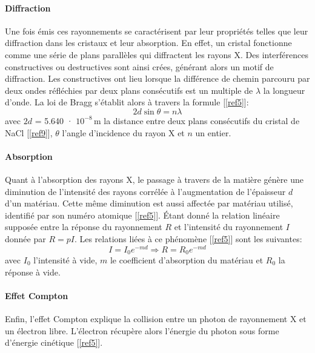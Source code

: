 \documentclass[a4paper, 12pt,oneside]{article}
\begin{document}
\paragraph{Diffraction}
Une fois émis ces rayonnements se caractérisent par leur propriétés telles que leur diffraction dans les cristaux et leur absorption. En effet, un cristal fonctionne comme une série de plans parallèles qui diffractent les rayons X. Des interférences constructives ou destructives sont ainsi crées, générant alors un motif de diffraction. Les constructives ont lieu lorsque la différence de chemin parcouru par deux ondes réfléchies par deux plans consécutifs est un multiple de $\lambda$ la longueur d'onde. La loi de Bragg s'établit alors à travers la formule [\ref{ref5}]:
\vspace{-0.2cm}
\begin{equation}
    2d\sin{\theta}=n\lambda
\label{eq2}
\end{equation}
\vspace{-0.05cm}
avec $2d$ = 5.640 · $10^{-8}$\,m la distance entre deux plans consécutifs du cristal de NaCl [\ref{ref9}], $\theta$ l'angle d'incidence du rayon X et $n$ un entier.\\

\paragraph{Absorption}
Quant à l'absorption des rayons X, le passage à travers de la matière génère une diminution de l'intensité des rayons corrélée à l'augmentation de l'épaisseur $d$ d'un matériau. Cette même diminution est aussi affectée par matériau utilisé, identifié par son numéro atomique [\ref{ref5}]. Étant donné la relation linéaire supposée entre la réponse du rayonnement $R$ et l'intensité du rayonnement $I$ donnée par $R= pI$. Les relations liées à ce phénomène [\ref{ref5}] sont les suivantes:
\vspace{-0.15cm}
\begin{equation}
    I=I_0e^{-md} \Rightarrow
    R=R_0e^{-md}
\label{eq3}
\end{equation}
\vspace{-0.05cm}
avec $I_0$ l'intensité à vide, $m$ le coefficient d'absorption du matériau et $R_0$ la réponse à vide.\\
\paragraph{Effet Compton}Enfin, l'effet Compton explique la collision entre un photon de rayonnement X et un électron libre. L'électron récupère alors l'énergie du photon sous forme d'énergie cinétique [\ref{ref5}].
\vspace{-0.2cm}
\end{document}
